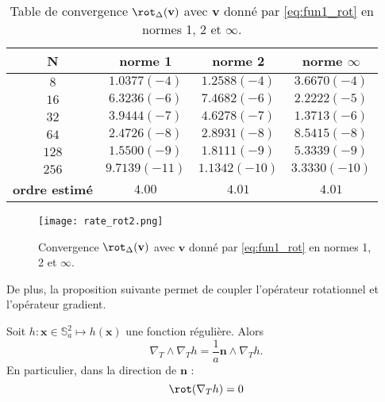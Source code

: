 \begin{table}[htbp]
\begin{center}
\begin{tabular}{|c||c|c|c|}
\hline
\textbf{N}  & \textbf{norme 1} & \textbf{norme 2} & \textbf{norme $\infty$} \\
\hline
\hline
$8$  & $1.0377(-4)$  & $1.2588(-4)$  & $3.6670(-4)$  \\
$16$ & $6.3236(-6)$  & $7.4682(-6)$  & $2.2222(-5)$  \\
$32$ & $3.9444(-7)$  & $4.6278(-7)$  & $1.3713(-6)$  \\
$64$ & $2.4726(-8)$  & $2.8931(-8)$  & $8.5415(-8)$  \\
$128$& $1.5500(-9)$  & $1.8111(-9)$  & $5.3339(-9)$  \\
$256$& $9.7139(-11)$ & $1.1342(-10)$ & $3.3330(-10)$ \\
\hline 
\hline
\textbf{ordre estimé}& $4.00$ & $4.01$ & $4.01$\\
\hline
\end{tabular}
\end{center}
\caption{Table de convergence $\rot_{\Delta} ( \mathbf{v} )$ avec $\mathbf{v}$ donné par \eqref{eq:fun1_rot} en normes 1, 2 et $\infty$.}
\label{tab:rate_rot2}
\end{table} 

\begin{figure}[htbp]
\begin{center}
\texttt{[image: rate\_rot2.png]}
\end{center}
\caption{Convergence $\rot_{\Delta} ( \mathbf{v} )$ avec $\mathbf{v}$ donné par \eqref{eq:fun1_rot} en normes 1, 2 et $\infty$.}
\label{fig:rate_rot2}
\end{figure}
























De plus, la proposition suivante permet de coupler l'opérateur rotationnel et l'opérateur gradient.

\begin{proposition}
Soit $h : \mathbf{x} \in \mathbb{S}_a^2 \mapsto h(\mathbf{x})$ une fonction régulière. Alors 
\begin{equation}
\nabla_T \wedge \nabla_T h = \dfrac{1}{a} \mathbf{n} \wedge \nabla_T h.
\end{equation}
En particulier, dans la direction de $\mathbf{n}$ :
\begin{equation}
\rot(\nabla_T h) = 0
\end{equation}
\label{prop:vort_grad}
\end{proposition}

